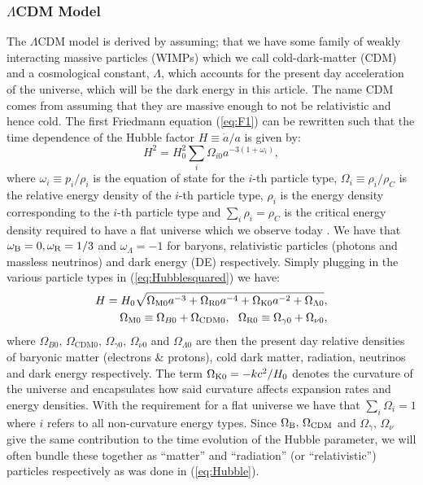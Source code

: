 \documentclass[%
reprint,
 amsmath,amssymb,
 aps,
]{revtex4-2}
\begin{document}
\subsubsection{$\Lambda$CDM Model}
The $\Lambda$CDM model is derived by assuming; that we have some family of weakly interacting massive particles (WIMPs) which we call cold-dark-matter (CDM) and a cosmological constant, $\Lambda$, which accounts for the present day acceleration of the universe, which will be the dark energy in this article. The name CDM comes from assuming that they are massive enough to not be relativistic and hence cold. 
The first Friedmann equation (\ref{eq:F1}) can be rewritten such that the time dependence of the Hubble factor $H\equiv\dot{a}/a$ is given by:
\begin{equation}
	H^2=H_0^2\sum_i\Omega_{i0}a^{-3(1+\omega_i)},
	\label{eq:Hubblesquared}
\end{equation}
where $\omega_i\equiv p_i/\rho_i$ is the equation of state for the $i$-th particle type, $\Omega_i\equiv\rho_i/\rho_C$ is the relative energy density of the $i$-th particle type, $\rho_i$ is the energy density corresponding to the $i$-th particle type and $\sum_i\rho_i=\rho_C$ is the critical energy density required to have a flat universe which we observe today \cite{Planck:2018vyg}. We have that $\omega_{\text B}=0,\omega_{\text{R}}=1/3$ and $\omega_\Lambda=-1$ for baryons, relativistic particles (photons and massless neutrinos) and dark energy (DE) respectively. Simply plugging in the various particle types in (\ref{eq:Hubblesquared}) we have:
\begin{align}
	H=H_0\sqrt{\Omega_{\text M0}a^{-3}+\Omega_{\text{R}0}a^{-4}+\Omega_{\text K0}a^{-2}+\Omega_{\Lambda0}}, 
	\label{eq:Hubble}\\
	\Omega_{\text M0}\equiv \Omega_{B0}+\Omega_{\text{CDM}0},~~\Omega_{\text{R}0}\equiv \Omega_{\gamma0}+\Omega_{\nu0},\nonumber
\end{align}
where $\Omega_{B0},\,\Omega_{\text{CDM}0},\,\Omega_{\gamma0},\,\Omega_{\nu0}$ and $\Omega_{\Lambda0}$ are then the present day relative densities of baryonic matter (electrons \& protons), cold dark matter, radiation, neutrinos and dark energy respectively. The term $\Omega_{\text K0}=-kc^2/H_0$ denotes the curvature of the universe and encapsulates how said curvature affects expansion rates and energy densities. With the requirement for a flat universe we have that $\sum_i\Omega_i=1$ where $i$ refers to all non-curvature energy types. Since $\Omega_{\text B},\,\Omega_{\text{CDM}}$ and $\Omega_\gamma,\,\Omega_\nu$ give the same contribution to the time evolution of the Hubble parameter, we will often bundle these together as ``matter'' and ``radiation'' (or ``relativistic'') particles respectively as was done in (\ref{eq:Hubble}).
\end{document}
